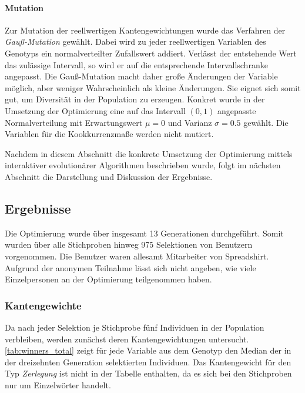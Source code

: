 \paragraph{Mutation}

Zur Mutation der reellwertigen Kantengewichtungen wurde das Verfahren der \emph{Gauß-Mutation} \cite{kw2007} gewählt. Dabei wird zu jeder reellwertigen Variablen des Genotyps ein normalverteilter Zufallswert addiert. Verlässt der entstehende Wert das zulässige Intervall, so wird er auf die entsprechende Intervallschranke angepasst. Die Gauß-Mutation macht daher große Änderungen der Variable möglich, aber weniger Wahrscheinlich als kleine Änderungen. Sie eignet sich somit gut, um Diversität in der Population zu erzeugen. Konkret wurde in der Umsetzung der Optimierung eine auf das Intervall \((0,1)\) angepasste Normalverteilung mit Erwartungswert \(\mu=0\) und Varianz \(\sigma=0.5\) gewählt. Die Variablen für die Kookkurrenzmaße werden nicht mutiert.

Nachdem in diesem Abschnitt die konkrete Umsetzung der Optimierung mittels interaktiver evolutionärer Algorithmen beschrieben wurde, folgt im nächsten Abschnitt die Darstellung und Diskussion der Ergebnisse.

\subsection{Ergebnisse}

Die Optimierung wurde über insgesamt \num{13} Generationen durchgeführt. Somit wurden über alle Stichproben hinweg \num{975} Selektionen von Benutzern vorgenommen. Die Benutzer waren allesamt Mitarbeiter von Spreadshirt. Aufgrund der anonymen Teilnahme lässt sich nicht angeben, wie viele Einzelpersonen an der Optimierung teilgenommen haben.

\subsubsection{Kantengewichte}

Da nach jeder Selektion je Stichprobe fünf Individuen in der Population verbleiben, werden zunächst deren Kantengewichtungen untersucht. \cref{tab:winners_total} zeigt für jede Variable aus dem Genotyp den Median der in der dreizehnten Generation selektierten Individuen. Das Kantengewicht für den Typ \emph{Zerlegung} ist nicht in der Tabelle enthalten, da es sich bei den Stichproben nur um Einzelwörter handelt.

